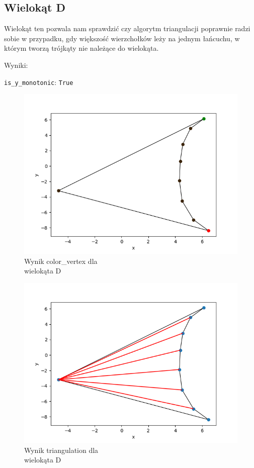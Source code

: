 \documentclass[11pt,a4paper]{article}
\begin{document}
\subsection{Wielokąt D}
Wielokąt ten pozwala nam sprawdzić czy algorytm triangulacji
poprawnie radzi sobie w przypadku, gdy większość wierzchołków leży
na jednym łańcuchu, w którym tworzą trójkąty nie należące do wielokąta.

Wyniki:

\verb|is_y_monotonic|: \verb|True|

\begin{minipage}{0.46\textwidth}
    \begin{figure}[H]
        \centering
        \includegraphics[scale=0.5]{res/pol_d_colors.png}
        \caption{Wynik \ttfamily color\_vertex \normalfont dla \\wielokąta D}
    \end{figure}
\end{minipage}
\begin{minipage}{0.46\textwidth}
    \begin{figure}[H]
        \centering
        \includegraphics[scale=0.5]{res/pol_d_tri.png}
        \caption{Wynik \ttfamily triangulation \normalfont dla \\wielokąta D}
    \end{figure}
\end{minipage}
\end{document}
